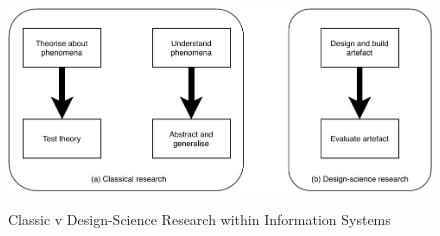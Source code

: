 \begin{figure}[!htb]
    \caption{Classic v Design-Science Research within Information Systems}
    \includegraphics[width=0.9\columnwidth]{fig/TypesOfResearch.pdf}
    \label{fig:typesofresearch}
\end{figure}
